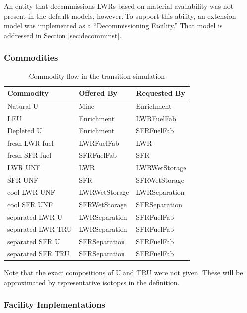 An entity that decommissions LWRs based on material availability was not 
present in the default models, however. To support this ability, an extension 
model was implemented as a ``Decommissioning Facility.'' That model is 
addressed in Section \ref{sec:decomminst}.

\subsubsection{Commodities}

\begin{table}[htbp!]
\centering
\begin{tabular}{|l|l|l|}
\hline
Commodity  &     Offered By  &    Requested By \\
\hline
Natural  U & Mine & Enrichment \\ 
LEU & Enrichment & LWRFuelFab \\ 
Depleted U & Enrichment & SFRFuelFab \\ 
fresh LWR fuel & LWRFuelFab & LWR \\ 
fresh SFR fuel & SFRFuelFab & SFR \\ 
LWR UNF & LWR & LWRWetStorage \\ 
SFR UNF & SFR & SFRWetStorage \\ 
cool LWR UNF & LWRWetStorage & LWRSeparation \\ 
cool SFR UNF & SFRWetStorage & SFRSeparation \\ 
separated LWR U & LWRSeparation & SFRFuelFab \\ 
separated LWR TRU & LWRSeparation & SFRFuelFab \\ 
separated SFR U & SFRSeparation & SFRFuelFab \\ 
separated SFR TRU & SFRSeparation & SFRFuelFab \\ 
\hline
\end{tabular}
\caption{Commodity flow in the transition simulation}
\label{tab:commods}
\end{table}
Note that the exact compositions of U and TRU were not given. These will be
approximated by representative isotopes in the \Cyclus definition.

\subsubsection{Facility Implementations}

